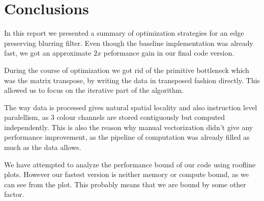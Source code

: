 \section{Conclusions}

In this report we presented a summary of optimization strategies for an edge preserving blurring filter. Even though the baseline implementation was already fast, we got an approximate $2x$ peformance gain in our final code version.

During the course of optimization we got rid of the primitive bottleneck which was the matrix transpose, by writing the data in transposed fashion directly. This allowed us to focus on the iterative part of the algorithm.

The way data is processed gives natural spatial locality and also instruction level paralellism, as 3 colour channels are stored contiguously but computed independently. This is also the reason why manual vectorization didn't give any performance improvement, as the pipeline of computation was already filled as much as the data allows.

We have attempted to analyze the performance bound of our code using roofline plots. However our fastest version is neither memory or compute bound, as we can see from the plot. This probably means that we are bound by some other factor. 

